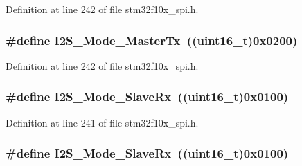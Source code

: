Definition at line 242 of file stm32f10x\+\_\+spi.\+h.

\subsubsection[{\texorpdfstring{I2\+S\+\_\+\+Mode\+\_\+\+Master\+Tx}{I2S_Mode_MasterTx}}]{\setlength{\rightskip}{0pt plus 5cm}\#define I2\+S\+\_\+\+Mode\+\_\+\+Master\+Tx~(({\bf uint16\+\_\+t})0x0200)}\hypertarget{group___i2_s___mode_ga3a62ee8964033a3f6fd030da9e40fba6}{}\label{group___i2_s___mode_ga3a62ee8964033a3f6fd030da9e40fba6}


Definition at line 242 of file stm32f10x\+\_\+spi.\+h.

\subsubsection[{\texorpdfstring{I2\+S\+\_\+\+Mode\+\_\+\+Slave\+Rx}{I2S_Mode_SlaveRx}}]{\setlength{\rightskip}{0pt plus 5cm}\#define I2\+S\+\_\+\+Mode\+\_\+\+Slave\+Rx~(({\bf uint16\+\_\+t})0x0100)}\hypertarget{group___i2_s___mode_gaaf62ee0353476afc9612dc2933e1c5c5}{}\label{group___i2_s___mode_gaaf62ee0353476afc9612dc2933e1c5c5}


Definition at line 241 of file stm32f10x\+\_\+spi.\+h.

\subsubsection[{\texorpdfstring{I2\+S\+\_\+\+Mode\+\_\+\+Slave\+Rx}{I2S_Mode_SlaveRx}}]{\setlength{\rightskip}{0pt plus 5cm}\#define I2\+S\+\_\+\+Mode\+\_\+\+Slave\+Rx~(({\bf uint16\+\_\+t})0x0100)}\hypertarget{group___i2_s___mode_gaaf62ee0353476afc9612dc2933e1c5c5}{}\label{group___i2_s___mode_gaaf62ee0353476afc9612dc2933e1c5c5}


